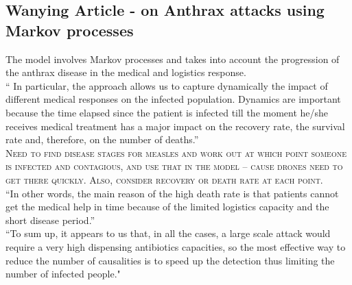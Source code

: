 \subsection{Wanying Article - on Anthrax attacks using Markov processes}
The model involves Markov processes and takes into account the progression of the anthrax disease in the medical and logistics response. \\
`` In particular, the approach allows us to capture dynamically the impact of different medical responses on the infected population. Dynamics are important because the time elapsed since the patient is infected till the moment he/she receives medical treatment has a major impact on the recovery rate, the survival rate and, therefore, on the number of deaths.” \citep{wanying2016modeling} \\
\textsc{Need to find disease stages for measles and work out at which point someone is infected and contagious, and use that in the model – cause drones need to get there quickly. Also, consider recovery or death rate at each point. } \\
``In other words, the main reason of the high death rate is that patients cannot get the medical help in time because of the limited logistics capacity and the short disease period.”\citep{wanying2016modeling} \\
``To sum up, it appears to us that, in all the cases, a large scale attack would require a very high dispensing antibiotics capacities, so the most effective way to reduce the number of causalities is to speed up the detection thus limiting the number of infected people."\citep{wanying2016modeling} \\

